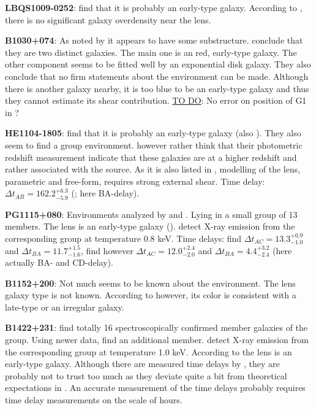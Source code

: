 \documentclass[10pt]{article}
\begin{document}
\textbf{LBQS1009-0252}: \cite{2000ApJ...536..584L} find that it is probably an early-type galaxy. According to \cite{2004A&A...428..741F}, there is no significant galaxy overdensity near the lens.

\textbf{B1030+074}: As noted by \cite{1998MNRAS.300..649X} it appears to have some substructure. \cite{2000ApJ...536..584L} conclude that they are two distinct galaxies. The main one is an red, early-type galaxy. The other component seems to be fitted well by an exponential disk galaxy. They also conclude that no firm statements about the environment can be made. Although there is another galaxy nearby, it is too blue to be an early-type galaxy and thus they cannot estimate its shear contribution. \underline{TO DO}: No error on position of G1 in \cite{2000ApJ...536..584L}?

\textbf{HE1104-1805}: \cite{2000ApJ...536..584L} find that it is probably an early-type galaxy (also \cite{2000A&A...360..853C}). They also seem to find a group environment. \cite{2004A&A...428..741F} however rather think that their photometric redshift measurement indicate that these galaxies are at a higher redshift and rather associated with the source. As it is also listed in \cite{2004A&A...428..741F}, modelling of the lens, parametric and free-form, requires strong external shear. Time delay: $\Delta t_{AB}=162.2^{+6.3}_{-5.9}$ (\cite{2008ApJ...676...80M}; here BA-delay).

\textbf{PG1115+080}: Environments analyzed by \cite{2006ApJ...641..169M} and \cite{2011ApJ...726...84W}. Lying in a small group of 13 members. The lens is an early-type galaxy (\cite{2005ApJ...626...51Y}). \cite{2004ApJ...610..686G} detect X-ray emission from the corresponding group at temperature 0.8 keV. Time delays: \cite{1997ApJ...489...21B} find $\Delta t_{AC}=13.3^{+0.9}_{-1.0}$ and $\Delta t_{BA}=11.7^{+1.5}_{-1.6}$, \cite{2010MNRAS.406.2764T} find however $\Delta t_{AC}=12.0^{+2.4}_{-2.0}$ and $\Delta t_{BA}=4.4^{+3.2}_{-2.4}$ (here actually BA- and CD-delay).

\textbf{B1152+200}: Not much seems to be known about the environment. The lens galaxy type is not known. According to \cite{2000A&A...357..115T} however, its color is consistent with a late-type or an irregular galaxy.

\textbf{B1422+231}: \cite{2006ApJ...641..169M} find totally 16 spectroscopically confirmed member galaxies of the group. Using newer data, \cite{2011ApJ...726...84W} find an additional member. \cite{2004ApJ...610..686G} detect X-ray emission from the corresponding group at temperature 1.0 keV. According to \cite{1996ApJ...462L..53I} the lens is an early-type galaxy. Although there are measured time delays by \cite{2001MNRAS.326.1403P}, they are probably not to trust too much as they deviate quite a bit from theoretical expectations in \cite{2003AJ....126...29R}. An accurate measurement of the time delays probably requires time delay measurements on the scale of hours.
\end{document}

